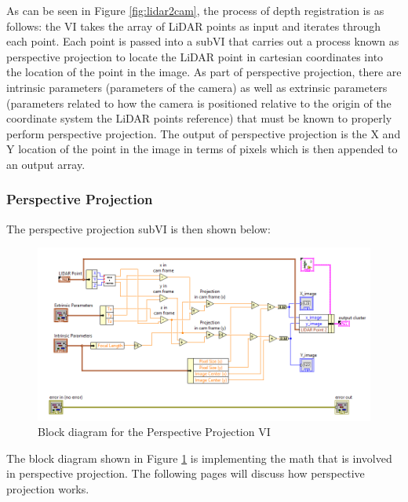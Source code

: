 \noindent As can be seen in Figure \ref{fig:lidar2cam}, the process of depth registration is as follows: the VI takes the array of LiDAR points as input and iterates through each point. Each point is passed into a subVI that carries out a process known as perspective projection to locate the LiDAR point in cartesian coordinates into the location of the point in the image. As part of perspective projection, there are intrinsic parameters (parameters of the camera) as well as extrinsic parameters (parameters related to how the camera is positioned relative to the origin of the coordinate system the LiDAR points reference) that must be known to properly perform perspective projection. The output of perspective projection is the X and Y location of the point in the image in terms of pixels which is then appended to an output array.

\subsubsection{Perspective Projection}
The perspective projection subVI is then shown below:

\begin{figure}[h!]
\centering
\includegraphics[scale=0.65]{Photos/perspectiveprojection.png}
\caption{Block diagram for the Perspective Projection VI}
\label{fig:perspectiveprojection}
\end{figure}

\noindent The block diagram shown in Figure \ref{fig:perspectiveprojection} is implementing the math that is involved in perspective projection. The following pages will discuss how perspective projection works.

\newpage




